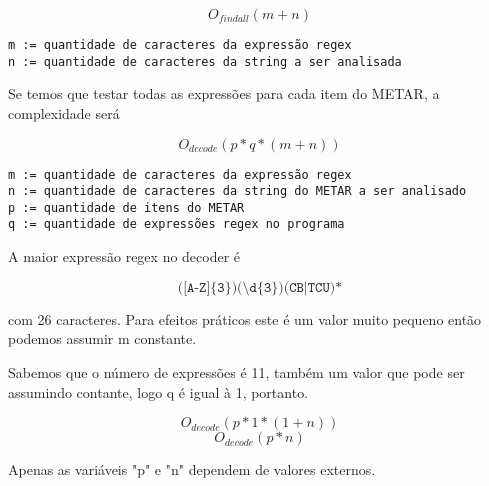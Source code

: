 $$ O_{findall}(m + n) $$

\begin{verbatim}
m := quantidade de caracteres da expressão regex
n := quantidade de caracteres da string a ser analisada
\end{verbatim}

Se temos que testar todas as expressões para cada item do METAR, a complexidade será

$$ O_{decode}(p * q * (m + n)) $$

\begin{verbatim}
m := quantidade de caracteres da expressão regex
n := quantidade de caracteres da string do METAR a ser analisado
p := quantidade de itens do METAR
q := quantidade de expressões regex no programa
\end{verbatim}


A maior expressão regex no decoder é 

\[
\texttt{([A-Z]\{3\})(\textbackslash d\{3\})(CB|TCU)*}
\] 

com 26 caracteres. Para efeitos práticos este é um valor muito pequeno então podemos assumir m constante.

Sabemos que o número de expressões é 11, também um valor que pode ser assumindo contante, logo
q é igual à 1, portanto.

$$ O_{decode}(p * 1 * (1 + n)) $$
$$ O_{decode}(p * n) $$

Apenas as variáveis "p" e "n" dependem de valores externos. 
